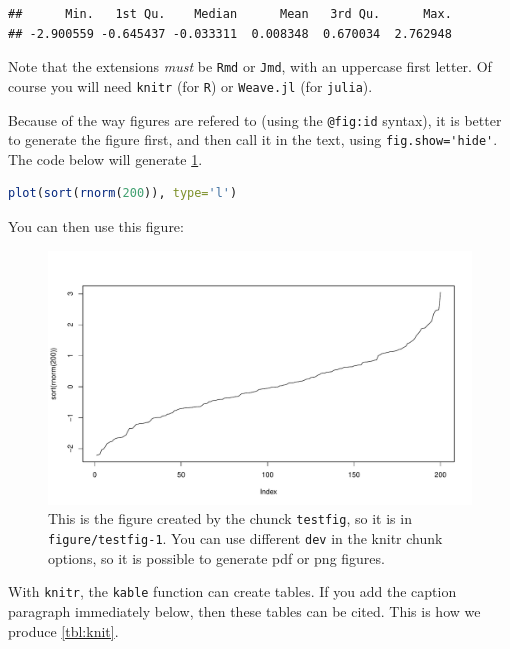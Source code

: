 \documentclass[12pt]{article}
\begin{document}
\begin{lstlisting}
##      Min.   1st Qu.    Median      Mean   3rd Qu.      Max. 
## -2.900559 -0.645437 -0.033311  0.008348  0.670034  2.762948
\end{lstlisting}

Note that the extensions \emph{must} be \lstinline!Rmd! or
\lstinline!Jmd!, with an uppercase first letter. Of course you will need
\lstinline!knitr! (for \lstinline!R!) or \lstinline!Weave.jl! (for
\lstinline!julia!).

Because of the way figures are refered to (using the \lstinline!@fig:id!
syntax), it is better to generate the figure first, and then call it in
the text, using \lstinline!fig.show='hide'!. The code below will
generate \cref{fig:chunk}.

\begin{lstlisting}[language=R]
plot(sort(rnorm(200)), type='l')
\end{lstlisting}

You can then use this figure:

\begin{figure}[htbp]
\centering
\includegraphics[width=1.00000\textwidth]{figure/testfig-1.pdf}
\caption{This is the figure created by the chunck \lstinline!testfig!,
so it is in \lstinline!figure/testfig-1!. You can use different
\lstinline!dev! in the knitr chunk options, so it is possible to
generate pdf or png figures.\label{fig:chunk}}
\end{figure}

With \lstinline!knitr!, the \lstinline!kable! function can create
tables. If you add the caption paragraph immediately below, then these
tables can be cited. This is how we produce
\cref{tbl:knit}.
\end{document}
